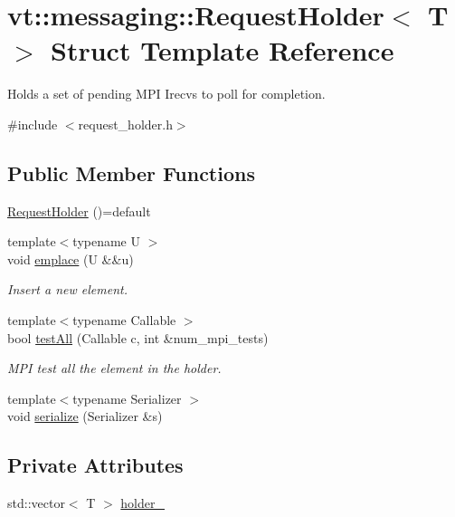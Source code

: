 \hypertarget{structvt_1_1messaging_1_1_request_holder}{}\section{vt\+:\+:messaging\+:\+:Request\+Holder$<$ T $>$ Struct Template Reference}
\label{structvt_1_1messaging_1_1_request_holder}


Holds a set of pending M\+PI Irecvs to poll for completion.  




{\ttfamily \#include $<$request\+\_\+holder.\+h$>$}

\subsection*{Public Member Functions}
\begin{DoxyCompactItemize}
\item 
\hyperlink{structvt_1_1messaging_1_1_request_holder_abf7510642c71a18bf6b5425e385546f2}{Request\+Holder} ()=default
\item 
{\footnotesize template$<$typename U $>$ }\\void \hyperlink{structvt_1_1messaging_1_1_request_holder_ae08498f2b80a7fdb486134a670d19307}{emplace} (U \&\&u)
\begin{DoxyCompactList}\small\item\em Insert a new element. \end{DoxyCompactList}\item 
{\footnotesize template$<$typename Callable $>$ }\\bool \hyperlink{structvt_1_1messaging_1_1_request_holder_af8954465588ec05efb6ccba01041e114}{test\+All} (Callable c, int \&num\+\_\+mpi\+\_\+tests)
\begin{DoxyCompactList}\small\item\em M\+PI test all the element in the holder. \end{DoxyCompactList}\item 
{\footnotesize template$<$typename Serializer $>$ }\\void \hyperlink{structvt_1_1messaging_1_1_request_holder_ae28c55a90b59c153d6ba72c875946f75}{serialize} (Serializer \&s)
\end{DoxyCompactItemize}
\subsection*{Private Attributes}
\begin{DoxyCompactItemize}
\item 
std\+::vector$<$ T $>$ \hyperlink{structvt_1_1messaging_1_1_request_holder_af222a1c32183c0bdb2400d0a41ed30a3}{holder\+\_\+}
\end{DoxyCompactItemize}


